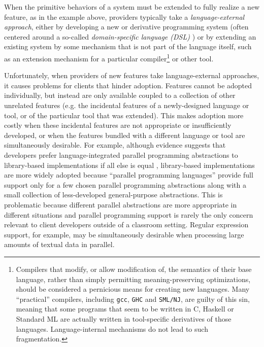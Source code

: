 When the primitive behaviors of a system must be extended to fully realize a new feature, as in the example above, providers typically take a \emph{language-external approach}, either by developing a new or derivative programming system (often centered around a so-called \emph{domain-specific language (DSL)} \cite{fowler2010domain}) or by extending an existing system by some mechanism that is not part of the language itself, such as an extension mechanism for a {particular} compiler\footnote{Compilers that modify, or allow modification of, the semantics of their base language, rather than simply permitting meaning-preserving optimizations, should be considered a pernicious means for creating new languages. Many ``practical'' compilers, including \texttt{gcc}, \texttt{GHC} and \texttt{SML/NJ}, are guilty of this sin, meaning that some programs that seem to be written in C, Haskell or Standard ML are actually written in tool-specific derivatives of those languages. Language-internal mechanisms do not lead to such fragmentation.} or other tool. %

Unfortunately, when providers of new features take language-external approaches, it causes problems for clients that hinder adoption. Features cannot be adopted individually, but instead are only available coupled to a collection of other unrelated  features (e.g. the incidental features of a newly-designed language or tool, or of the particular tool that was extended). This makes adoption more costly when these incidental features are  not appropriate or insufficiently developed, or when the features bundled with a different language or tool are simultaneously desirable. For example, although evidence suggests that developers prefer language-integrated parallel programming abstractions to library-based implementations if all else is equal \cite{langvslib}, library-based implementations are more widely adopted because ``parallel programming languages'' provide full support only for a few chosen parallel programming abstractions along with a small collection of less-developed general-purpose abstractions. This is problematic because different parallel abstractions are more appropriate in different situations \cite{ecoopstudy13} and parallel programming support is rarely the only concern relevant to client developers outside of a classroom setting. Regular expression support, for example, may be simultaneously desirable when processing large amounts of textual data in parallel. %

